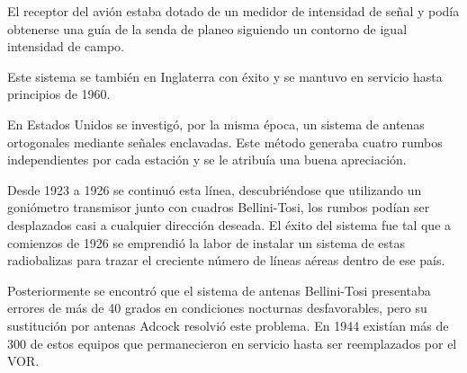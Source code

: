 El receptor del avi\'on estaba dotado de un medidor de intensidad de se\~nal y pod\'ia obtenerse una gu\'ia de la senda de planeo siguiendo un contorno de igual intensidad de campo.

Este sistema se tambi\'en en Inglaterra con \'exito y se mantuvo en servicio hasta principios de 1960.



En Estados Unidos se investig\'o, por la misma \'epoca, un sistema de antenas ortogonales mediante se\~nales enclavadas. Este m\'etodo generaba cuatro rumbos independientes por cada estaci\'on y se le atribu\'ia una buena apreciaci\'on. 

Desde 1923 a 1926 se continu\'o esta l\'inea, descubri\'endose que utilizando un goni\'ometro transmisor junto con cuadros Bellini-Tosi, los rumbos pod\'ian ser desplazados casi a cualquier direcci\'on deseada. El \'exito del sistema fue tal que a comienzos de 1926 se emprendi\'o la labor de instalar un sistema de estas radiobalizas para trazar el creciente n\'umero de l\'ineas a\'ereas dentro de ese pa\'is. 

Posteriormente se encontr\'o que el sistema de antenas Bellini-Tosi presentaba errores de m\'as de 40 grados en condiciones nocturnas desfavorables, pero su sustituci\'on por antenas Adcock resolvi\'o este problema. En 1944 exist\'ian m\'as de 300 de estos equipos que permanecieron en servicio hasta ser reemplazados por el VOR.


